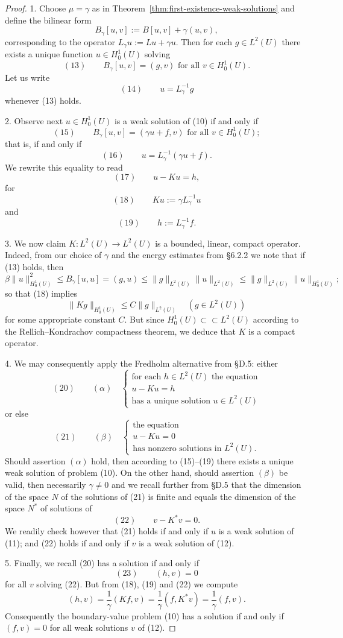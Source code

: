 \begin{proof}
1. Choose $\mu = \gamma$ as in Theorem~\ref{thm:first-existence-weak-solutions} and define the bilinear form
$$B_\gamma[u,v] := B[u,v] + \gamma(u,v),$$
corresponding to the operator $L_\gamma u := Lu + \gamma u$. Then for each $g \in L^2(U)$ there exists a unique function $u \in H_0^1(U)$ solving
$$(13) \qquad B_\gamma[u,v] = (g,v) \text{ for all } v \in H_0^1(U).$$
Let us write
$$(14) \qquad u = L_\gamma^{-1}g$$
whenever (13) holds.

2. Observe next $u \in H_0^1(U)$ is a weak solution of (10) if and only if
$$(15) \qquad B_\gamma[u,v] = (\gamma u + f,v) \text{ for all } v \in H_0^1(U);$$
that is, if and only if
$$(16) \qquad u = L_\gamma^{-1}(\gamma u + f).$$
We rewrite this equality to read
$$(17) \qquad u - Ku = h,$$
for
$$(18) \qquad Ku := \gamma L_\gamma^{-1}u$$
and
$$(19) \qquad h := L_\gamma^{-1}f.$$

3. We now claim $K : L^2(U) \to L^2(U)$ is a bounded, linear, compact operator. Indeed, from our choice of $\gamma$ and the energy estimates from \S6.2.2 we note that if (13) holds, then
$$\beta\|u\|_{H_0^1(U)}^2 \leq B_\gamma[u,u] = (g,u) \leq \|g\|_{L^2(U)}\|u\|_{L^2(U)} \leq \|g\|_{L^2(U)}\|u\|_{H_0^1(U)};$$
so that (18) implies
$$\|Kg\|_{H_0^1(U)} \leq C\|g\|_{L^2(U)} \quad (g \in L^2(U))$$
for some appropriate constant $C$. But since $H_0^1(U) \subset\subset L^2(U)$ according to the Rellich--Kondrachov compactness theorem, we deduce that $K$ is a compact operator.

4. We may consequently apply the Fredholm alternative from \S D.5: either
$$(20) \qquad (\alpha) \quad \begin{cases} \text{for each } h \in L^2(U) \text{ the equation} \\ u - Ku = h \\ \text{has a unique solution } u \in L^2(U) \end{cases}$$
or else
$$(21) \qquad (\beta) \quad \begin{cases} \text{the equation} \\ u - Ku = 0 \\ \text{has nonzero solutions in } L^2(U). \end{cases}$$
Should assertion $(\alpha)$ hold, then according to (15)--(19) there exists a unique weak solution of problem (10). On the other hand, should assertion $(\beta)$ be valid, then necessarily $\gamma \neq 0$ and we recall further from \S D.5 that the dimension of the space $N$ of the solutions of (21) is finite and equals the dimension of the space $N^*$ of solutions of
$$(22) \qquad v - K^*v = 0.$$
We readily check however that (21) holds if and only if $u$ is a weak solution of (11); and (22) holds if and only if $v$ is a weak solution of (12).

5. Finally, we recall (20) has a solution if and only if
$$(23) \qquad (h,v) = 0$$
for all $v$ solving (22). But from (18), (19) and (22) we compute
$$(h,v) = \frac1\gamma(Kf,v) = \frac1\gamma(f,K^*v) = \frac1\gamma(f,v).$$
Consequently the boundary-value problem (10) has a solution if and only if $(f,v) = 0$ for all weak solutions $v$ of (12).
\end{proof}

